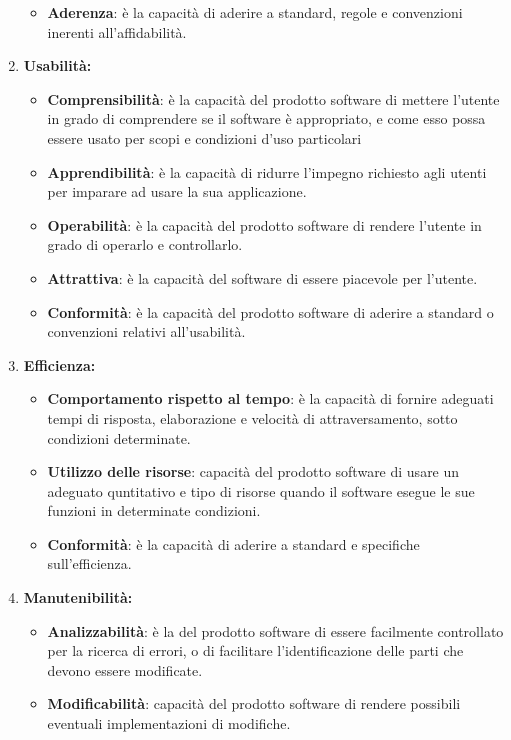 \begin{enumerate}
\begin{itemize}
      \item \textbf{Aderenza}: è la capacità di aderire a standard, regole e convenzioni inerenti all'affidabilità.
    \end{itemize}
    \item \textbf{Usabilità:}
    \begin{itemize}
      \item \textbf{Comprensibilità}: è la capacità del prodotto software di mettere l'utente in grado di comprendere se il software è appropriato, e come esso possa essere usato per scopi e condizioni d'uso particolari
      \item \textbf{Apprendibilità}: è la capacità di ridurre l'impegno richiesto agli utenti per imparare ad usare la sua applicazione.
      \item \textbf{Operabilità}: è la capacità del prodotto software di rendere l'utente in grado di operarlo e controllarlo.
      \item \textbf{Attrattiva}: è la capacità del software di essere piacevole per l'utente.
      \item \textbf{Conformità}: è la capacità del prodotto software di aderire a standard o convenzioni relativi all'usabilità.
    \end{itemize}
    \item \textbf{Efficienza:}
    \begin{itemize}
      \item \textbf{Comportamento rispetto al tempo}: è la capacità di fornire adeguati tempi di risposta, elaborazione e velocità di attraversamento, sotto condizioni determinate.
      \item \textbf{Utilizzo delle risorse}: capacità del prodotto software di usare un adeguato quntitativo e tipo di risorse quando il software esegue le sue funzioni in determinate condizioni.
      \item \textbf{Conformità}: è la capacità di aderire a standard e specifiche sull'efficienza.
    \end{itemize}
    \item \textbf{Manutenibilità:}
    \begin{itemize}
      \item \textbf{Analizzabilità}: è la del prodotto software di essere facilmente controllato per la ricerca di errori, o di facilitare l'identificazione delle parti che devono essere modificate.
      \item \textbf{Modificabilità}: capacità del prodotto software di rendere possibili eventuali implementazioni di modifiche.

\end{itemize}
\end{enumerate}

